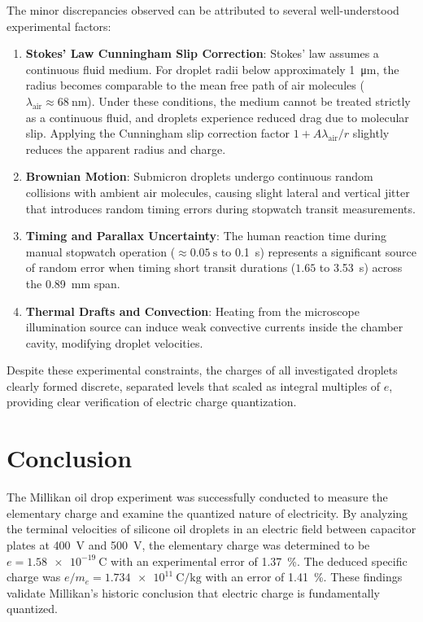 \documentclass[journal]{IEEEtran}
\begin{document}
The minor discrepancies observed can be attributed to several well-understood experimental factors:
\begin{enumerate}
    \item \textbf{Stokes' Law Cunningham Slip Correction}: Stokes' law assumes a continuous fluid medium. For droplet radii below approximately \SI{1}{\micro\meter}, the radius becomes comparable to the mean free path of air molecules ($\lambda_{\text{air}} \approx \SI{68}{\nano\meter}$). Under these conditions, the medium cannot be treated strictly as a continuous fluid, and droplets experience reduced drag due to molecular slip. Applying the Cunningham slip correction factor $1 + A\lambda_{\text{air}}/r$ slightly reduces the apparent radius and charge.
    \item \textbf{Brownian Motion}: Submicron droplets undergo continuous random collisions with ambient air molecules, causing slight lateral and vertical jitter that introduces random timing errors during stopwatch transit measurements.
    \item \textbf{Timing and Parallax Uncertainty}: The human reaction time during manual stopwatch operation ($\approx \SI{0.05}{\second}$ to \SI{0.1}{\second}) represents a significant source of random error when timing short transit durations ($1.65$ to \SI{3.53}{\second}) across the \SI{0.89}{\milli\meter} span.
    \item \textbf{Thermal Drafts and Convection}: Heating from the microscope illumination source can induce weak convective currents inside the chamber cavity, modifying droplet velocities.
\end{enumerate}

Despite these experimental constraints, the charges of all investigated droplets clearly formed discrete, separated levels that scaled as integral multiples of $e$, providing clear verification of electric charge quantization.

\section{Conclusion}
The Millikan oil drop experiment was successfully conducted to measure the elementary charge and examine the quantized nature of electricity. By analyzing the terminal velocities of silicone oil droplets in an electric field between capacitor plates at \SI{400}{\volt} and \SI{500}{\volt}, the elementary charge was determined to be $e = \SI{1.58e-19}{\coulomb}$ with an experimental error of \SI{1.37}{\percent}. The deduced specific charge was $e/m_e = \SI{1.734e11}{\coulomb\per\kilogram}$ with an error of \SI{1.41}{\percent}. These findings validate Millikan's historic conclusion that electric charge is fundamentally quantized.
\end{document}
